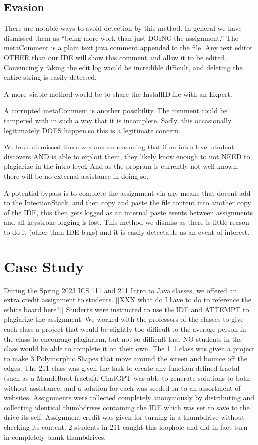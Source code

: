 \documentclass[conference]{IEEEtran}
\newcommand{\n}{\hfill\break}
\newcommand{\installID}{InstallID\xspace}
\newcommand{\metaComment}{metaComment\xspace}
\newcommand{\infectionStack}{InfectionStack\xspace}
\begin{document}
\subsection*{\textbf{Evasion}}
There are notable ways to avoid detection by this method.  In general we have dismissed them as ``being more work than just DOING the assignment.''  The \metaComment is a plain text java comment appended to the file.  Any text editor OTHER than our IDE will show this comment and allow it to be edited.  Convincingly faking the edit log would be incredible difficult, and deleting the entire string is easily detected.

A more viable method would be to share the \installID file with an Expert.


A corrupted \metaComment is another possibility.  The comment could be tampered with in such a way that it is incomplete.  Sadly, this occasionally legitimately DOES happen so this is a legitimate concern.

We have dismissed these weaknesses reasoning that if an intro level student discovers AND is able to exploit them, they likely know enough to not NEED to plagiarize in the intro level.  And as the program is currently not well known, there will be no external assistance in doing so.

A potential bypass is to complete the assignment via any means that doesnt add to the \infectionStack, and then copy and paste the file content into another copy of the IDE, this then gets logged as an internal paste events between assignments and all keystroke logging is lost.  This method we dismiss as there is little reason to do it (other than IDE bugs) and it is easily detectable as an event of interest.

\n\section*{\textbf{Case Study}}
During the Spring 2023 ICS 111 and 211 Intro to Java classes, we offered an extra credit assignment to students. [[XXX what do I have to do to reference the ethics board here?]]
Students were instructed to use the IDE and ATTEMPT to plagiarize the assignment.  We worked with the professors of the classes to give each class a project that would be slightly too difficult to the average person in the class to encourage plagiarism, but not so difficult that NO students in the class would be able to complete it on their own.  The 111 class was given a project to make 3 Polymorphic Shapes that move around the screen and bounce off the edges.  The 211 class was given the task to create any function defined fractal (such as a Mandelbrot fractal).  ChatGPT was able to generate solutions to both without assistance, and a solution for each was seeded on to an assortment of websites.  Assignments were collected completely anonymously by distributing and collecting identical thumbdrives containing the IDE which was set to save to the drive its self.  Assignment credit was given for turning in a thumbdrive without checking its content.  2 students in 211 caught this loophole and did in-fact turn in completely blank thumbdrives.
\end{document}
